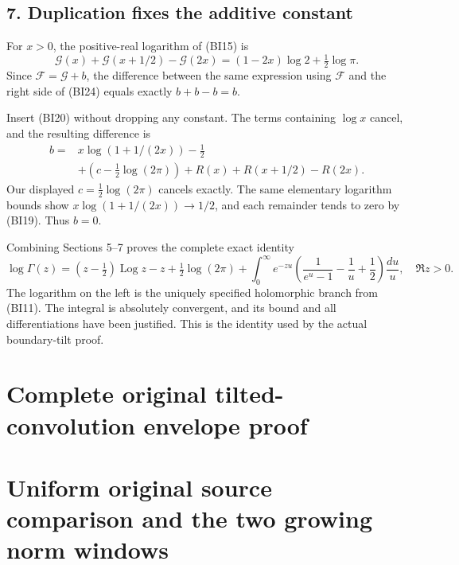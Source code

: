 \documentclass[11pt,a4paper]{article}
\begin{document}
\subsection{7. Duplication fixes the additive constant}\label{bt:duplication-fixes-the-additive-constant}

For \(x>0\), the positive-real logarithm of (BI15) is \[
\mathcal G(x)+\mathcal G(x+1/2)-\mathcal G(2x)
=(1-2x)\log2+\tfrac12\log\pi.
\tag{BI24}
\] Since \(\mathcal F=\mathcal G+b\), the difference between the same expression using \(\mathcal F\) and the right side of (BI24) equals exactly \(b+b-b=b\).

Insert (BI20) without dropping any constant. The terms containing \(\log x\) cancel, and the resulting difference is \[
\begin{split}
b={}&x\log(1+1/(2x))-\tfrac12\\
&+\left(c-\tfrac12\log(2\pi)\right)
 +R(x)+R(x+1/2)-R(2x).
\end{split}
\tag{BI25}
\] Our displayed \(c=\tfrac12\log(2\pi)\) cancels exactly. The same elementary logarithm bounds show \(x\log(1+1/(2x))\to1/2\), and each remainder tends to zero by (BI19). Thus \(b=0\).

Combining Sections 5--7 proves the complete exact identity \[
\boxed{
\log\Gamma(z)
=(z-\tfrac12)\operatorname{Log}z-z+\tfrac12\log(2\pi)
+\int_0^\infty e^{-zu}
\left(\frac1{e^u-1}-\frac1u+\frac12\right)\frac{du}{u},
\quad\Re z>0.}
\tag{BI26}
\] The logarithm on the left is the uniquely specified holomorphic branch from (BI11). The integral is absolutely convergent, and its bound and all differentiations have been justified. This is the identity used by the actual boundary-tilt proof.

\endgroup

\clearpage
\begingroup


\setcounter{equation}{0}
\renewcommand{\theequation}{TW.\arabic{equation}}
\section*{Complete original tilted-convolution envelope proof}
\section{Uniform original source comparison and the two growing norm windows}
\end{document}
